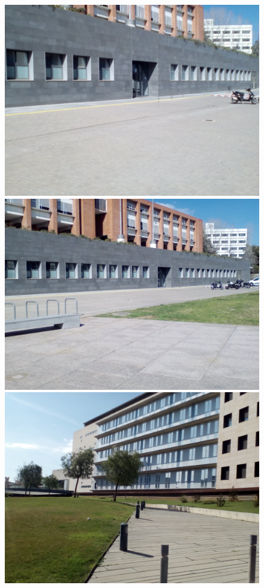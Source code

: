 		\begin{figure}[!htb]
				\includegraphics[width=\linewidth]{images/experiments/uni1}
				\label{fig:awesome_image1}
			\endminipage\hfill
				\includegraphics[width=\linewidth]{images/experiments/uni2}
				\label{fig:awesome_image2}
			\endminipage\hfill
				\includegraphics[width=\linewidth]{images/experiments/uni3}

\end{figure}
